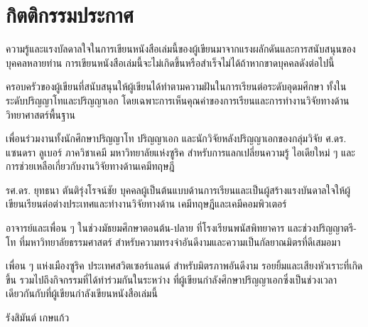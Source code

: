 

{

\chapter*{\centering กิตติกรรมประกาศ}

ความรู้และแรงบัลดาลใจในการเขียนหนังสือเล่มนี้ของผู้เขียนมาจากแรงผลักดันและการสนับสนุนของบุคคลหลายท่าน 
การเขียนหนังสือเล่มนี้จะไม่เกิดขึ้นหรือสำเร็จไม่ได้ถ้าหากขาดบุคคลดังต่อไปนี้

ครอบครัวของผู้เขียนที่สนับสนุนให้ผู้เขียนได้ทำตามความฝันในการเรียนต่อระดับอุดมศึกษา ทั้งในระดับปริญญาโทและปริญญาเอก 
โดยเฉพาะการเห็นคุณค่าของการเรียนและการทำงานวิจัยทางด้านวิทยาศาสตร์พื้นฐาน

เพื่อนร่วมงานทั้งนักศึกษาปริญญาโท ปริญญาเอก และนักวิจัยหลังปริญญาเอกของกลุ่มวิจัย ศ.ดร. แซนดรา ลูเบอร์ ภาควิชาเคมี
มหาวิทยาลัยแห่งซูริค สำหรับการแลกเปลี่ยนความรู้ ไอเดียใหม่ ๆ และการช่วยเหลือเกี่ยวกับงานวิจัยทางด้านเคมีทฤษฎี

รศ.ดร. ยุทธนา ตันติรุ่งโรจน์ชัย บุคคลผู้เป็นต้นแบบด้านการเรียนและเป็นผู้สร้างแรงบันดาลใจให้ผู้เขียนเรียนต่อต่างประเทศและทำงานวิจัยทางด้าน%
เคมีทฤษฎีและเคมีคอมพิวเตอร์

อาจารย์และเพื่อน ๆ ในช่วงมัธยมศึกษาตอนต้น-ปลาย ที่โรงเรียนพนัสพิทยาคาร และช่วงปริญญาตรี-โท ที่มหาวิทยาลัยธรรมศาสตร์ 
สำหรับความทรงจำอันดีงามและความเป็นกัลยาณมิตรที่ดีเสมอมา

เพื่อน ๆ แห่งเมืองซูริค ประเทศสวิตเซอร์แลนด์ สำหรับมิตรภาพอันดีงาม รอยยิ้มและเสียงหัวเราะที่เกิดขึ้น รวมไปถึงกิจกรรมที่ได้ทำร่วมกันในระหว่าง%
ที่ผู้เขียนกำลังศึกษาปริญญาเอกซึ่งเป็นช่วงเวลาเดียวกันกับที่ผู้เขียนกำลังเขียนหนังสือเล่มนี้

\medskip

\begin{flushright}
รังสิมันต์ เกษแก้ว
\end{flushright}
}
